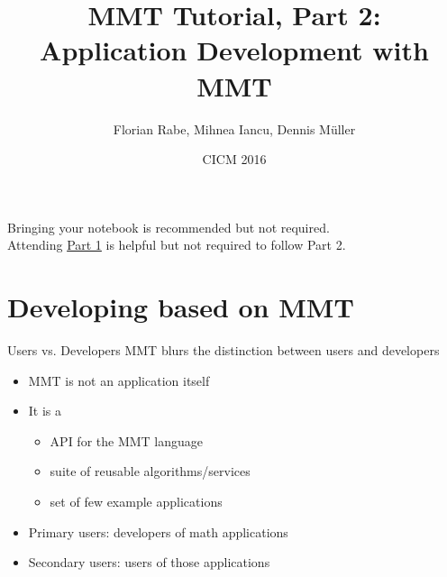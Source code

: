 \documentclass{beamer}
\begin{document}
\title{MMT Tutorial, Part 2: \\ Application Development with MMT}
\author{Florian Rabe, Mihnea Iancu, Dennis M\"uller}
\date{CICM 2016}
\begin{frame}
    \titlepage 
\begin{center}
Bringing your notebook is recommended but not required.\\
Attending \hyperref{http://www.cicm-conference.org/2016/slides/MMTLanguages.pdf}{}{}{Part 1} is helpful but not required to follow Part 2.
\end{center}
\end{frame}


\section{Developing based on MMT}

\begin{myframe}{Users vs. Developers}
MMT blurs the distinction between users and developers
\begin{itemize}
 \item MMT is not an application itself
 \item It is a
  \begin{itemize}
    \item API for the MMT language
    \item suite of reusable algorithms/services
    \item set of few example applications
   \end{itemize}
 \item Primary users: developers of math applications
 \item Secondary users: users of those applications
\end{itemize}
\end{myframe}
\end{document}
